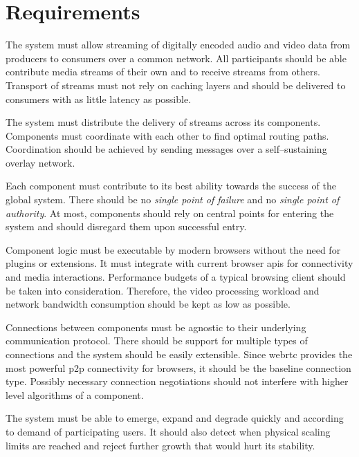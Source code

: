 \section{Requirements}\label{sec:requirements}

\begin{enumerate}
The system must allow streaming of digitally encoded audio and video data from producers to consumers over a common network. All participants should be able contribute media streams of their own and to receive streams from others. Transport of streams must not rely on caching layers and should be delivered to consumers with as little latency as possible.

The system must distribute the delivery of streams across its components. Components must coordinate with each other to find optimal routing paths. Coordination should be achieved by sending messages over a self–sustaining overlay network.

Each component must contribute to its best ability towards the success of the global system. There should be no \textit{single point of failure} and no \textit{single point of authority}. At most, components should rely on central points for entering the system and should disregard them upon successful entry.

Component logic must be executable by modern browsers without the need for plugins or extensions. It must integrate with current browser \glspl{api} for connectivity and media interactions. Performance budgets of a typical browsing client should be taken into consideration. Therefore, the video processing workload and network bandwidth consumption should be kept as low as possible.

Connections between components must be agnostic to their underlying communication protocol. There should be support for multiple types of connections and the system should be easily extensible. Since \gls{webrtc} provides the most powerful \gls{p2p} connectivity for browsers, it should be the baseline connection type. Possibly necessary connection negotiations should not interfere with higher level algorithms of a component.

The system must be able to emerge, expand and degrade quickly and according to demand of participating users. It should also detect when physical scaling limits are reached and reject further growth that would hurt its stability.


\end{enumerate}
